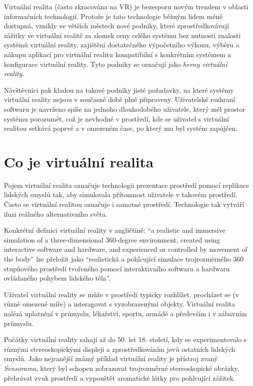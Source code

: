Virtuální realita (často zkracována na VR) je bezesporu novým trendem v
oblasti informačních technologií. Protože je tato technologie běžným
lidem méně dostupná, vznikly ve větších městech nové podniky, které
zprostředkovávají zážitky ve virtuální realitě za zlomek ceny celého
systému bez nutnosti znalosti systémů virtuální reality, zajištění
dostatečného výpočetního výkonu, výběru a nákupu aplikací pro virtuální
realitu kompatibilní s konkrétním systémem a konfigurace virtuální
reality. Tyto podniky se označují jako \emph{herny virtuální reality}. \autocite{herny}

Návštěvníci pak kladou na takové podniky jisté požadavky, na které
systémy virtuální reality nejsou v současné době plně připraveny.
Uživatelské rozhraní softwaru je navrženo spíše na jednoho dlouhodobého
uživatele, který měl prostor systému porozumět, což je nevhodné v
prostředí, kde se uživatel s virtuální realitou setkává poprvé a v
omezeném čase, po který mu byl systém zapůjčen.

\section{Co je virtuální
realita}\label{co-je-virtuuxe1lnuxed-realita}

Pojem virtuální realita označuje technologii prezentace prostředí pomocí
replikace lidských smyslů tak, aby simulovala přítomnost uživatele v
takovém prostředí. Často se virtuální realitou označuje i samotné
prostředí. Technologie tak vytváří iluzi reálného alternativního světa. \autocite{ovr}

Konkrétní definici virtuální reality v angličtině: ``a realistic and
immersive simulation of a three-dimensional 360-degree environment,
created using interactive software and hardware, and experienced or
controlled by movement of the body'' \autocite{vrdef} lze přeložit jako ``realistická a
pohlcující simulace trojrozměrného 360 stupňového prostředí tvořeného
pomocí interaktivního softwaru a hardwaru ovládaného pohybem lidského
těla''.

Uživatel virtuální reality se může v prostředí typicky rozhlížet,
procházet se (v různě omezené míře) a interagovat s vyzobrazenými
objekty. \autocite{vrdef2} Virtuální realita nalézá uplatnění v průmyslu, lékařství,
sportu, armádě a především i v zábavním průmyslu. \autocite{vrusage}

Počátky virtuální reality sahají až do 50. let 18. století, kdy se
experimentovalo s různými stereoskopickými displeji a zprostředkováním
jevů ostatních lidských smyslů. Jako nejranější známý příklad virtuální
reality je přístroj zvaný \emph{Sensorama}, který byl schopen zobrazovat
trojrozměrné stereoskopické obrázky, přehrávat zvuk prostředí a
vypouštět aromatické látky pro pohlcující zážitek. \autocite{oldvr}

